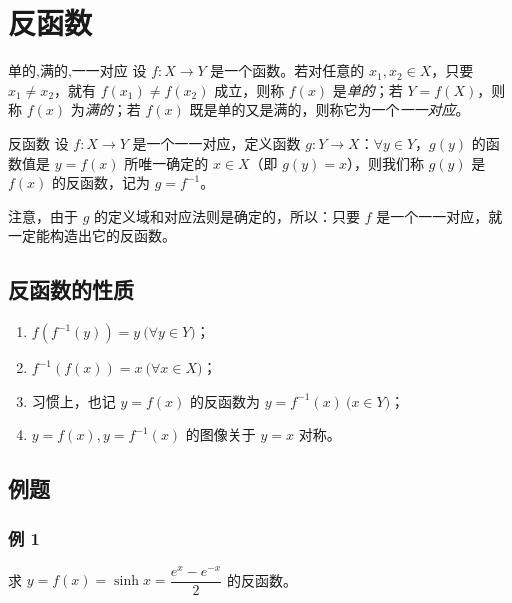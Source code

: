 
\section{反函数}

\begin{definition}{单的,满的,一一对应}
	设 $f: X \rightarrow Y$ 是一个函数。若对任意的 $x_1, x_2 \in X$，只要 $x_1 \ne x_2$，就有 $f(x_1) \ne f(x_2)$ 成立，则称 $f(x)$ 是\emph{单的}；若 $Y = f(X)$，则称 $f(x)$ 为\emph{满的}；若 $f(x)$ 既是单的又是满的，则称它为一个\emph{一一对应}。
\end{definition}

\begin{definition}{反函数}
	设 $f: X \rightarrow Y$ 是一个一一对应，定义函数 $g: Y \rightarrow X$：$\forall y \in Y$，$g(y)$ 的函数值是 $y = f(x)$ 所唯一确定的 $x \in X$（即 $g(y) = x$），则我们称 $g(y)$ 是 $f(x)$ 的反函数，记为 $g = f^{-1}$。
\end{definition}

注意，由于 $g$ 的定义域和对应法则是确定的，所以：只要 $f$ 是一个一一对应，就一定能构造出它的反函数。

\subsection{反函数的性质}

\begin{enumerate}
	\item $f(f^{-1}(y)) = y \pod{\forall y \in Y}$；
	\item $f^{-1}(f(x)) = x \pod{\forall x \in X}$；
	\item 习惯上，也记 $y = f(x)$ 的反函数为 $y = f^{-1}(x) \pod{x \in Y}$；
	\item $y = f(x), y = f^{-1}(x)$ 的图像关于 $y = x$ 对称。
\end{enumerate}

\subsection{例题}

\subsubsection*{例 1}

求 $y = f(x) = \sinh x = \dfrac{e^x - e^{-x}}{2}$ 的反函数。

